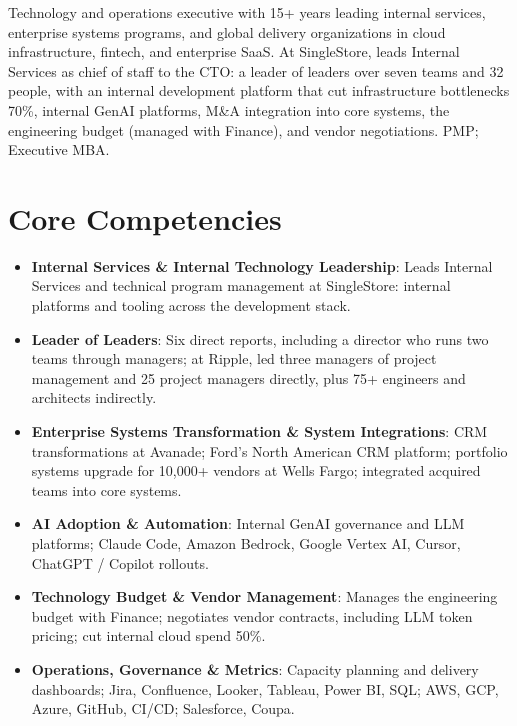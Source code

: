 \documentclass[11pt,letterpaper,sans]{moderncv}
\begin{document}
\makecvtitle


\vspace{6pt}
\small{Technology and operations executive with 15+ years leading internal services, enterprise systems programs, and global delivery organizations in cloud infrastructure, fintech, and enterprise SaaS. At SingleStore, leads Internal Services as chief of staff to the CTO: a leader of leaders over seven teams and 32 people, with an internal development platform that cut infrastructure bottlenecks 70\%, internal GenAI platforms, M\&A integration into core systems, the engineering budget (managed with Finance), and vendor negotiations. PMP; Executive MBA.}


\section{Core Competencies}
\vspace{1pt}
\begin{itemize}

\item \textbf{Internal Services \& Internal Technology Leadership}: Leads Internal Services and technical program management at SingleStore: internal platforms and tooling across the development stack.

\item \textbf{Leader of Leaders}: Six direct reports, including a director who runs two teams through managers; at Ripple, led three managers of project management and 25 project managers directly, plus 75+ engineers and architects indirectly.

\item \textbf{Enterprise Systems Transformation \& System Integrations}: CRM transformations at Avanade; Ford's North American CRM platform; portfolio systems upgrade for 10,000+ vendors at Wells Fargo; integrated acquired teams into core systems.

\item \textbf{AI Adoption \& Automation}: Internal GenAI governance and LLM platforms; Claude Code, Amazon Bedrock, Google Vertex AI, Cursor, ChatGPT / Copilot rollouts.

\item \textbf{Technology Budget \& Vendor Management}: Manages the engineering budget with Finance; negotiates vendor contracts, including LLM token pricing; cut internal cloud spend 50\%.

\item \textbf{Operations, Governance \& Metrics}: Capacity planning and delivery dashboards; Jira, Confluence, Looker, Tableau, Power BI, SQL; AWS, GCP, Azure, GitHub, CI/CD; Salesforce, Coupa.

\end{itemize}
\end{document}
